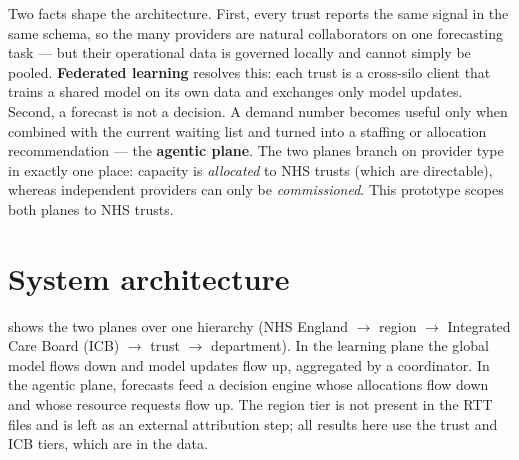 \documentclass[11pt,a4paper]{article}
\begin{document}
Two facts shape the architecture. First, every trust reports the same signal in the same schema, so
the many providers are natural collaborators on one forecasting task --- but their operational data
is governed locally and cannot simply be pooled. \textbf{Federated learning} resolves this: each
trust is a cross-silo client that trains a shared model on its own data and exchanges only model
updates. Second, a forecast is not a decision. A demand number becomes useful only when combined with
the current waiting list and turned into a staffing or allocation recommendation --- the
\textbf{agentic plane}. The two planes branch on provider type in exactly one place: capacity is
\emph{allocated} to NHS trusts (which are directable), whereas independent providers can only be
\emph{commissioned}. This prototype scopes both planes to NHS trusts.

\section{System architecture}\label{sec:arch}
 shows the two planes over one hierarchy (NHS England $\rightarrow$ region
$\rightarrow$ Integrated Care Board (ICB) $\rightarrow$ trust $\rightarrow$ department). In the
learning plane the global model flows down and model updates flow up, aggregated by a coordinator. In
the agentic plane, forecasts feed a decision engine whose allocations flow down and whose resource
requests flow up. The region tier is not present in the RTT files and is left as an external
attribution step; all results here use the trust and ICB tiers, which are in the data.
\end{document}
